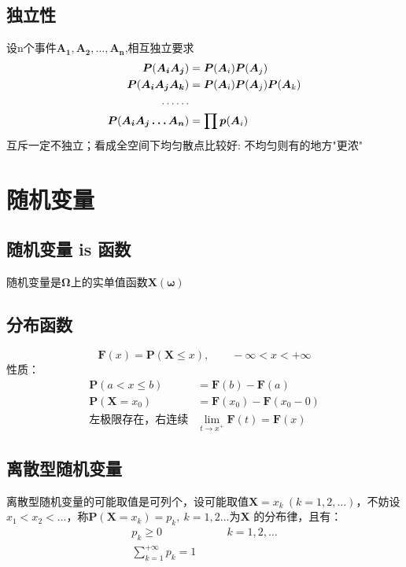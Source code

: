 \documentclass[a4paper]{ctexart}
\begin{document}
\subsection{独立性}
设n个事件$\bm {A_1,A_2,\ldots,A_n}$,相互独立要求
\begin{align}
    \bm P(\bm{A_iA_j})            & =\bm P(\bm A_i)\bm P(\bm A_j) \notag              \\
    \bm P(\bm {A_iA_jA_k})        & =\bm P(\bm A_i)\bm P(\bm A_j)\bm P(\bm A_k)\notag \\
    \ldots\ldots                                                                      \\
    \bm P(\bm {A_iA_j\ldots A_n}) & =\prod \bm p(\bm A_i) \notag
\end{align}
{\color{blue}互斥一定不独立；{看成全空间下均匀散点比较好: 不均匀则有的地方"更浓"}}
\clearpage
\section{随机变量}
\subsection{随机变量 is 函数}
随机变量是$\bm \Omega$上的实单值函数$\bm X(\bm \omega)$
\subsection{分布函数}
\begin{equation}
    \bm F(x)=\bm P(\bm X\le x),\qquad -\infty<x<+\infty
\end{equation}
性质：
\begin{equation}
    \begin{aligned}
        \bm P(a<x\le b)           & =\bm F(b)-\bm F(a)                        \\
        \bm P(\bm X=x_0)          & =\bm F(x_0)-\bm F(x_0-0)                  \\
        \text{左极限存在，右连续} & \lim_{t\rightarrow x^+} \bm F(t)=\bm F(x)
    \end{aligned}
\end{equation}
\subsection{离散型随机变量}
离散型随机变量的可能取值是{\color{red}可列}个，设可能取值$\bm X=x_k\ (k=1,2,\ldots)$，不妨设$x_1<x_2<\ldots$，称$\bm P(\bm X=x_k)=p_k,\ k=1,2\ldots$为$\bm X$ 的分布律，且有：\\
\begin{equation}
    \begin{aligned}
        p_k\geq 0                  & \qquad k=1,2,\ldots \\
        \sum_{k=1}^{+\infty} p_k=1 &
    \end{aligned}
\end{equation}
\end{document}
